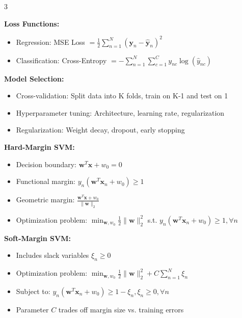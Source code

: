 \documentclass[10pt,landscape]{article}
\begin{document}
\begin{multicols}{3}
\begin{tcolorbox}[breakable, title=Neural Networks, colback=neural, boxsep=1pt, left=1pt, right=1pt, top=1pt, bottom=1pt]
\textbf{Loss Functions:}
\begin{itemize}[leftmargin=*,noitemsep,topsep=0pt]
    \item Regression: MSE Loss $= \frac{1}{2}\sum_{n=1}^N(\mathbf{y}_n - \hat{\mathbf{y}}_n)^2$
    \item Classification: Cross-Entropy $= -\sum_{n=1}^N\sum_{c=1}^C y_{nc}\log(\hat{y}_{nc})$
\end{itemize}

\textbf{Model Selection:}
\begin{itemize}[leftmargin=*,noitemsep,topsep=0pt]
    \item Cross-validation: Split data into K folds, train on K-1 and test on 1
    \item Hyperparameter tuning: Architecture, learning rate, regularization
    \item Regularization: Weight decay, dropout, early stopping
\end{itemize}
\end{tcolorbox}

\begin{tcolorbox}[breakable, title=Support Vector Machines, colback=svm, boxsep=1pt, left=1pt, right=1pt, top=1pt, bottom=1pt]
\textbf{Hard-Margin SVM:}
\begin{itemize}[leftmargin=*,noitemsep,topsep=0pt]
    \item Decision boundary: $\mathbf{w}^T\mathbf{x} + w_0 = 0$
    \item Functional margin: $y_n(\mathbf{w}^T\mathbf{x}_n + w_0) \geq 1$
    \item Geometric margin: $\frac{\mathbf{w}^T\mathbf{x} + w_0}{\|\mathbf{w}\|_2}$
    \item Optimization problem: $\min_{\mathbf{w},w_0} \frac{1}{2}\|\mathbf{w}\|_2^2$ s.t. $y_n(\mathbf{w}^T\mathbf{x}_n + w_0) \geq 1, \forall n$
\end{itemize}

\textbf{Soft-Margin SVM:}
\begin{itemize}[leftmargin=*,noitemsep,topsep=0pt]
    \item Includes slack variables $\xi_n \geq 0$
    \item Optimization problem: $\min_{\mathbf{w},w_0} \frac{1}{2}\|\mathbf{w}\|_2^2 + C\sum_{n=1}^N \xi_n$
    \item Subject to: $y_n(\mathbf{w}^T\mathbf{x}_n + w_0) \geq 1 - \xi_n, \xi_n \geq 0, \forall n$
    \item Parameter $C$ trades off margin size vs. training errors
\end{itemize}


\end{tcolorbox}
\end{multicols}
\end{document}
